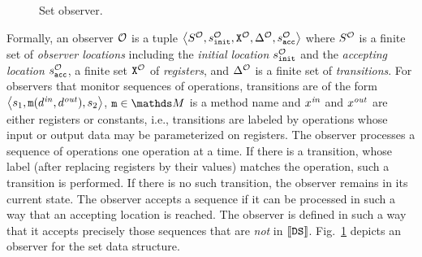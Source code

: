 \begin{figure}
\begin{center}
\end{center}
\caption{Set observer.}
\label{set:observer:fig}
\end{figure}

Formally, an observer ${\mathcal O}$ is a tuple
$\left\langle S^{\mathcal O},s^{\mathcal O}_{\tt init},{\tt X}^{{\mathcal O}},\Delta^{\mathcal O},s^{\mathcal O}_{\tt acc}\right\rangle$ where $S^{\mathcal O}$ is a finite set 
of {\it observer locations} including the 
{\it initial location} $s^{\mathcal O}_{\tt init}$ and
the {\it accepting location} $s^{\mathcal O}_{\tt acc}$, 
a finite set ${\tt X}^{{\mathcal O}}$  
of {\it registers}, and $\Delta^{\mathcal O}$ is a finite
set of {\it transitions}.
%
%
For observers that monitor sequences of operations,
transitions are of the form 
$\left\langle s_1,{\tt m}(d^{\it in},d^{\it out}),s_2\right\rangle$,
$\mname\in\malphabet$ is a method name and 
$x^{\it in}$ and $x^{\it out}$ are either registers or constants, i.e.,
transitions are labeled by 
operations whose input or output data may be parameterized on registers.
The observer processes a sequence of operations one operation at a time.
%
If there is a transition, whose label (after replacing registers by their
values) matches the operation, such a transition is performed. 
%
If there is no
such transition, the observer remains in its current state.
The observer accepts a sequence if it can  be processed in such a way that
an accepting location is reached.
%
The observer is defined in such a way that it accepts precisely those
sequences that are {\em not} in $\left\llbracket{{\tt DS}}\right\rrbracket$.
Fig.~\ref{set:observer:fig}
depicts an observer for the set data structure.

